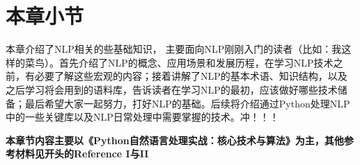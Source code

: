 \documentclass[UTF8]{ctexart}
\begin{document}

\section{本章小节}
本章介绍了NLP相关的些基础知识， 主要面向NLP刚刚入门的读者（比如：我这样的菜鸟）。首先介绍了NLP的概念、应用场景和发展历程，在学习NLP技术之前，有必要了解这些宏观的内容；接着讲解了NLP的基本术语、知识结构，以及之后学习将会用到的语料库，告诉读者在学习NLP的最初，应该做好哪些技术储备；最后希望大家一起努力，打好NLP的基础。后续将介绍通过Python处理NLP中的一些关键库以及NLP日常处理中需要掌握的技术。冲！！！



\textbf{本章节内容主要以《Python自然语言处理实战：核心技术与算法》为主，其他参考材料见开头的Reference I与II}
\end{document}
